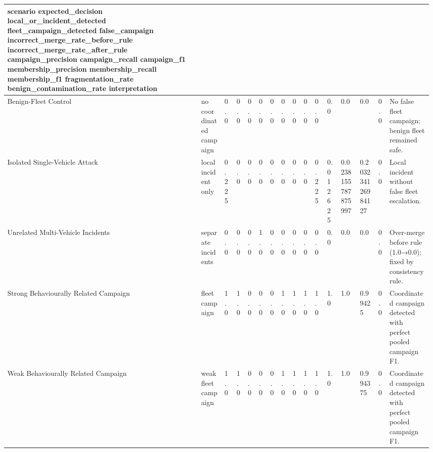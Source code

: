\begin{tabular}{llllllllllllllll}
\hline
\textbf{scenario} \textbf{expected_decision} \textbf{local_or_incident_detected} \textbf{fleet_campaign_detected} \textbf{false_campaign} \textbf{incorrect_merge_rate_before_rule} \textbf{incorrect_merge_rate_after_rule} \textbf{campaign_precision} \textbf{campaign_recall} \textbf{campaign_f1} \textbf{membership_precision} \textbf{membership_recall} \textbf{membership_f1} \textbf{fragmentation_rate} \textbf{benign_contamination_rate} \textbf{interpretation} \\
\hline
Benign-Fleet Control & no coordinated campaign & 0.0 & 0.0 & 0.0 & 0.0 & 0.0 & 0.0 & 0.0 & 0.0 & 0.0 & 0.0 & 0.0 & 0.0 & 0.0 & No false fleet campaign; benign fleet remained safe. \\
Isolated Single-Vehicle Attack & local incident only & 0.225 & 0.0 & 0.0 & 0.0 & 0.0 & 0.0 & 0.0 & 0.0 & 0.225 & 0.012625 & 0.0238155787875997 & 0.203234126984127 & 0.0 & Local incident without false fleet escalation. \\
Unrelated Multi-Vehicle Incidents & separate incidents & 0.0 & 0.0 & 0.0 & 1.0 & 0.0 & 0.0 & 0.0 & 0.0 & 0.0 & 0.0 & 0.0 & 0.0 & 0.0 & Over-merge before rule (1.0→0.0); fixed by consistency rule. \\
Strong Behaviourally Related Campaign & fleet campaign & 1.0 & 1.0 & 0.0 & 0.0 & 0.0 & 1.0 & 1.0 & 1.0 & 1.0 & 1.0 & 1.0 & 0.99425 & 0.0 & Coordinated campaign detected with perfect pooled campaign F1. \\
Weak Behaviourally Related Campaign & weak fleet campaign & 1.0 & 1.0 & 0.0 & 0.0 & 0.0 & 1.0 & 1.0 & 1.0 & 1.0 & 1.0 & 1.0 & 0.994375 & 0.0 & Coordinated campaign detected with perfect pooled campaign F1. \\
\hline
\end{tabular}
